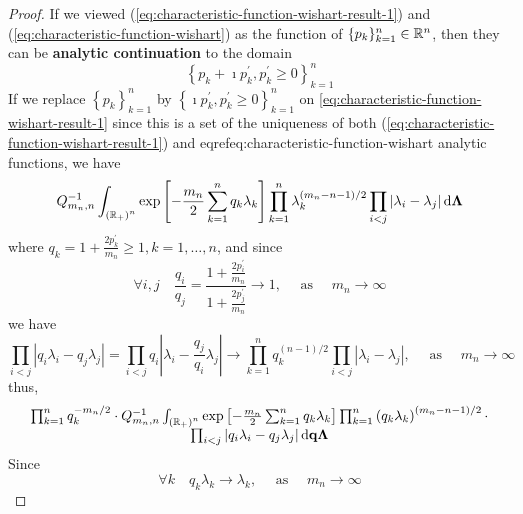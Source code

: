 \begin{proof}
	If we viewed (\ref{eq:characteristic-function-wishart-result-1}) and (\ref{eq:characteristic-function-wishart}) as the function of $\{p_{k}\}_{k=1}^{n}\in{\mathbb R}^{n}$, then they can be \textbf{analytic continuation} to the domain
	\begin{equation*}
		\left\{p_{k}+\imath p_{k}^{\prime},p_{k}^{\prime}\geq 0\right\}_{k=1}^{n}
	\end{equation*}
	If we replace $\left\{p_{k}\right\}_{k=1}^{n}$ by $\left\{\imath p_{k}^{\prime},p_{k}^{\prime}\geq 0\right\}_{k=1}^{n}$ on \eqref{eq:characteristic-function-wishart-result-1} since this is a set of the uniqueness of both (\ref{eq:characteristic-function-wishart-result-1}) and eqref{eq:characteristic-function-wishart} analytic functions, we have
	\begin{equation*}
		Q_{m_{n},n}^{-1}\int_{\left({\mathbb R}_{+}\right)^{n}}\exp\left[-\frac{m_{n}}{2}\sum_{k=1}^{n}q_{k}\lambda_{k}\right]\prod_{k=1}^{n}\lambda_{k}^{(m_{n}-n-1)/2}\prod_{i<j}\left|\lambda_{i}-\lambda_{j}\right|\mathop{}\!\mathrm{d}\boldsymbol{\Lambda}
	\end{equation*}
	where $q_{k}=1+\frac{2p_{k}^{\prime}}{m_{n}}\geq 1,k=1,\ldots,n$, and since
	\begin{equation*}
		\forall i,j\quad\frac{q_{i}}{q_{j}}=\frac{1+\frac{2p_{i}^{\prime}}{m_{n}}}{1+\frac{2p_{j}^{\prime}}{m_{n}}}\rightarrow 1,\quad\text{ as }\quad m_{n}\rightarrow\infty
	\end{equation*}
	we have
	\begin{equation*}
		\prod_{i<j}\left|q_{i}\lambda_{i}-q_{j}\lambda_{j}\right|=\prod_{i<j}q_{i}\left|\lambda_{i}-\frac{q_{j}}{q_{i}}\lambda_{j}\right|\rightarrow\prod_{k=1}^{n}q_{k}^{(n-1)/2}\prod_{i<j}\left|\lambda_{i}-\lambda_{j}\right|,\quad\text{ as }\quad m_{n}\rightarrow\infty
	\end{equation*}
	thus,
	\begin{equation*}
		\begin{array}{c}
			\prod_{k=1}^{n}q_{k}^{-m_{n}/2}\cdot Q_{m_{n},n}^{-1}\int_{\left({\mathbb R}_{+}\right)^{n}}\exp\left[-\frac{m_{n}}{2}\sum_{k=1}^{n}q_{k}\lambda_{k}\right]\prod_{k=1}^{n}\left(q_{k}\lambda_{k}\right)^{(m_{n}-n-1)/2}\cdot \\
			\prod_{i<j}\left|q_{i}\lambda_{i}-q_{j}\lambda_{j}\right|\mathop{}\!\mathrm{d}{\bf q}\boldsymbol{\Lambda}
		\end{array}
	\end{equation*}
	Since
	\begin{equation*}
		\forall k\quad q_{k}\lambda_{k}\rightarrow\lambda_{k},\quad\text{ as }\quad m_{n}\rightarrow\infty
	\end{equation*}

\end{proof}
